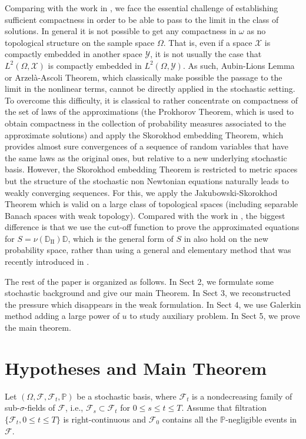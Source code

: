\documentclass[reqno]{amsart}
\theoremstyle{definition}
\theoremstyle{remark}
\numberwithin{equation}{section} \allowdisplaybreaks
\begin{document}
 Comparing
with the work in \cite{JW}, we face the essential challenge of
establishing sufficient compactness in order to be able to pass to
the limit in the class of solutions. In general it is not possible
to get any compactness in $\omega$ as no topological structure on
the sample space $\Omega$. That is, even if a space $\mathcal{X}$ is
compactly embedded in another space $\mathcal{Y}$, it is not usually
the case that $L^2(\Omega,\mathcal{X})$ is compactly embedded in
$L^2(\Omega,\mathcal{Y})$. As such, Aubin-Lions Lemma or
Arzel\`{a}-Ascoli Theorem, which classically make possible the
passage to the limit in the nonlinear terms, cannot be directly
applied in the stochastic setting. To overcome this difficulty, it
is classical to rather concentrate on compactness of the set of laws
of the approximations (the Prokhorov Theorem, which is used to
obtain compactness in the collection of probability measures
associated to the approximate solutions) and apply the Skorokhod
embedding Theorem, which provides almost sure convergences of a
sequence of random variables that have the same laws as the original
ones, but relative to a new underlying stochastic basis. However,
the Skorokhod embedding Theorem is restricted to metric spaces but
the structure of the stochastic non Newtonian equations naturally
leads to weakly converging sequences. For this, we apply the
Jakubowski-Skorokhod Theorem which is valid on a large class of
topological spaces (including separable Banach spaces with weak
topology).  Compared with the work in \cite{BD}, the biggest
difference is that we use the cut-off function to prove the
approximated equations for
$S=\nu(\mathbb{D}_{\text{II}})\mathbb{D}$, which is the general form
of $S$ in \cite{BD} also hold on the new probability space, rather
than using a general and elementary method that was recently
introduced in \cite{MO}.

The rest of the paper is organized as follows. In Sect 2, we
formulate some stochastic background and give our main Theorem. In
Sect 3, we reconstructed the pressure which disappears in the weak
formulation. In Sect 4, we use Galerkin method adding a large power
of $u$ to study auxiliary problem. In Sect 5, we prove the main
theorem.






\section{Hypotheses and Main Theorem}
Let $(\Omega,\mathscr{F},\mathscr{F}_{t},\mathbb{P})$ be a
stochastic basis, where $\mathscr{F}_t$ is a nondecreasing family of
sub-$\sigma$-fields of $\mathscr{F}$, i.e.,
$\mathscr{F}_s\subset\mathscr{F}_t$ for $0\leq s\leq t\leq T$.
Assume that filtration $\{\mathscr{F}_t,0\leq t\leq T\}$ is
right-continuous and $\mathscr{F}_0$ contains all the
$\mathbb{P}$-negligible events in $\mathscr{F}$.
\end{document}

